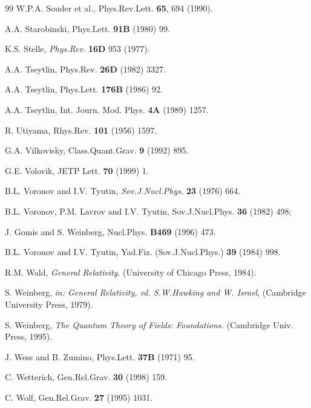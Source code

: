 \begin{thebibliography}{99}
 W.P.A. Souder  et al., Phys.Rev.Lett. {\bf 65}, 694 
(1990).

A.A. Starobinski, Phys.Lett. {\bf 91B} (1980) 99.

K.S. Stelle, {\sl Phys.Rev.} {\bf 16D} 953 (1977).

  A.A. Tseytlin, Phys.Rev. {\bf 26D} (1982) 3327.

  A.A. Tseytlin,  Phys.Lett. {\bf 176B} (1986) 92.

 A.A. Tseytlin, 
Int. Journ. Mod. Phys. {\bf 4A} (1989) 1257. %

R. Utiyama, Rhys.Rev. {\bf 101} (1956) 1597.

G.A. Vilkovisky, Class.Quant.Grav. {\bf 9} (1992) 895.  %

 G.E. Volovik, JETP Lett. {\bf 70} (1999) 1.  %

 B.L. Voronov and I.V. Tyutin, {\sl Sov.J.Nucl.Phys.}
{\bf 23} (1976) 664.

 B.L. Voronov, P.M. Lavrov and I.V. Tyutin,
Sov.J.Nucl.Phys. {\bf 36} (1982) 498;

J. Gomis and S. Weinberg, Nucl.Phys. {\bf B469} (1996) 473.

 B.L. Voronov and I.V. Tyutin,
Yad.Fiz. (Sov.J.Nucl.Phys.) {\bf 39} (1984) 998. 

 R.M. Wald, {\sl General Relativity}. (University of 
Chicago Press, 1984).

S. Weinberg, {\sl in: General Relativity, ed. 
S.W.Hawking and W. Israel}, (Cambridge University Press, 1979).

S. Weinberg, {\sl The Quantum Theory of Fields:
Foundations.} (Cambridge Univ. Press, 1995).

 J. Wess and B. Zumino, Phys.Lett. {\bf 37B} (1971) 95. 

 C. Wetterich, Gen.Rel.Grav. {\bf 30} (1998) 159.

 C. Wolf, Gen.Rel.Grav. {\bf 27} (1995) 1031.


\end{thebibliography}
